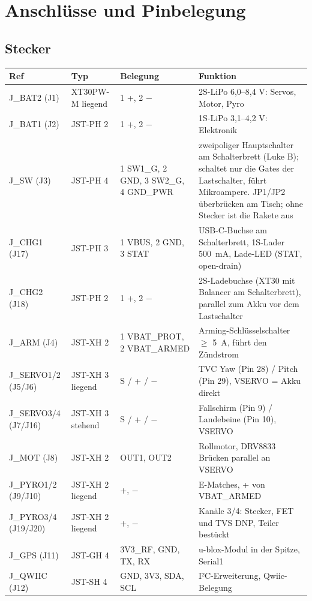 \documentclass[10pt,a4paper,twoside]{article}
\begin{document}
\section{Anschlüsse und Pinbelegung}

\subsection{Stecker}
\begin{tabularx}{\textwidth}{L{22mm} L{34mm} L{34mm} X}
\toprule
\textbf{Ref} & \textbf{Typ} & \textbf{Belegung} & \textbf{Funktion}\\
\midrule
J\_BAT2 (J1) & XT30PW-M liegend & 1 +, 2 $-$ & 2S-LiPo 6,0--8,4 V: Servos, Motor, Pyro\\
J\_BAT1 (J2) & JST-PH 2 & 1 +, 2 $-$ & 1S-LiPo 3,1--4,2 V: Elektronik\\
J\_SW (J3) & JST-PH 4 & 1 SW1\_G, 2 GND, 3 SW2\_G, 4 GND\_PWR & zweipoliger Hauptschalter am Schalterbrett (Luke B); schaltet nur die Gates der Lastschalter, führt Mikroampere. JP1/JP2 überbrücken am Tisch; ohne Stecker ist die Rakete aus\\
J\_CHG1 (J17) & JST-PH 3 & 1 VBUS, 2 GND, 3 STAT & USB-C-Buchse am Schalterbrett, 1S-Lader \SI{500}{mA}, Lade-LED (STAT, open-drain)\\
J\_CHG2 (J18) & JST-PH 2 & 1 +, 2 $-$ & 2S-Ladebuchse (XT30 mit Balancer am Schalterbrett), parallel zum Akku vor dem Lastschalter\\
J\_ARM (J4) & JST-XH 2 & 1 VBAT\_PROT, 2 VBAT\_ARMED & Arming-Schlüsselschalter $\ge$ \SI{5}{A}, führt den Zündstrom\\
J\_SERVO1/2 (J5/J6) & JST-XH 3 liegend & S / + / $-$ & TVC Yaw (Pin 28) / Pitch (Pin 29), VSERVO = Akku direkt\\
J\_SERVO3/4 (J7/J16) & JST-XH 3 stehend & S / + / $-$ & Fallschirm (Pin 9) / Landebeine (Pin 10), VSERVO\\
J\_MOT (J8) & JST-XH 2 & OUT1, OUT2 & Rollmotor, DRV8833 Brücken parallel an VSERVO\\
J\_PYRO1/2 (J9/J10) & JST-XH 2 liegend & +, $-$ & E-Matches, + von VBAT\_ARMED\\
J\_PYRO3/4 (J19/J20) & JST-XH 2 liegend & +, $-$ & Kanäle 3/4: Stecker, FET und TVS DNP, Teiler bestückt\\
J\_GPS (J11) & JST-GH 4 & 3V3\_RF, GND, TX, RX & u-blox-Modul in der Spitze, Serial1\\
J\_QWIIC (J12) & JST-SH 4 & GND, 3V3, SDA, SCL & I²C-Erweiterung, Qwiic-Belegung\\

\end{tabularx}
\end{document}
